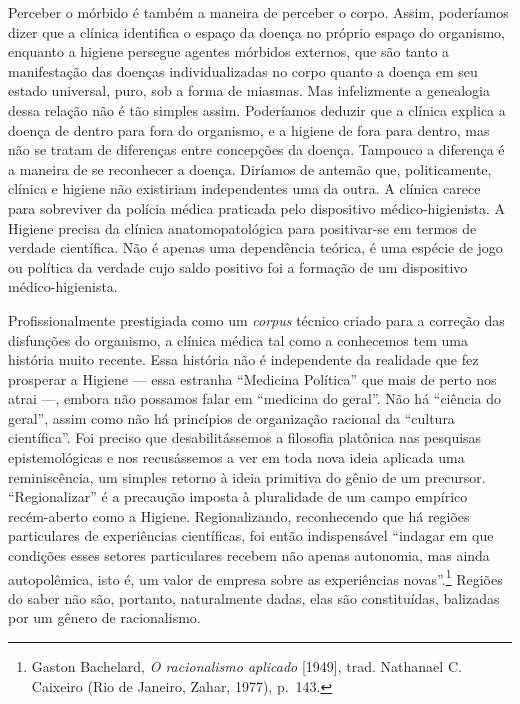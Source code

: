 Perceber o mórbido é também a maneira de perceber o corpo. Assim,
poderíamos dizer que a clínica identifica o espaço da doença no próprio
espaço do organismo, enquanto a higiene persegue agentes mórbidos
externos, que são tanto a manifestação das doenças individualizadas no
corpo quanto a doença em seu estado universal, puro, sob a forma de
miasmas. Mas infelizmente a genealogia dessa relação não é tão simples
assim. Poderíamos deduzir que a clínica explica a doença de dentro para
fora do organismo, e a higiene de fora para dentro, mas não se tratam de
diferenças entre concepções da doença. Tampouco a diferença é a maneira
de se reconhecer a doença. Diríamos de antemão que, politicamente,
clínica e higiene não existiriam independentes uma da outra. A clínica
carece para sobreviver da polícia médica praticada pelo dispositivo
médico-higienista. A Higiene precisa da clínica anatomopatológica para
positivar-se em termos de verdade científica. Não é apenas uma
dependência teórica, é uma espécie de jogo ou política da verdade cujo
saldo positivo foi a formação de um dispositivo médico-higienista.

Profissionalmente prestigiada como um \textit{corpus} técnico criado para
a correção das disfunções do organismo, a clínica médica tal como a
conhecemos tem uma história muito recente. Essa história não é
independente da realidade que fez prosperar a Higiene --- essa estranha
``Medicina Política'' que mais de perto nos atrai ---, embora não
possamos falar em ``medicina do geral''. Não há ``ciência do geral'',
assim como não há princípios de organização racional da ``cultura
científica''. Foi preciso que desabilitássemos a filosofia platônica nas
pesquisas epistemológicas e nos recusássemos a ver em toda nova ideia
aplicada uma reminiscência, um simples retorno à ideia primitiva do
gênio de um precursor. ``Regionalizar'' é a precaução imposta à
pluralidade de um campo empírico recém-aberto como a Higiene.
Regionalizando, reconhecendo que há regiões particulares de experiências
científicas, foi então indispensável ``indagar em que condições esses
setores particulares recebem não apenas autonomia, mas ainda
autopolêmica, isto é, um valor de empresa sobre as experiências
novas''.\footnote{Gaston Bachelard, \textit{O racionalismo aplicado}
  {[}1949{]}, trad. Nathanael C. Caixeiro (Rio de Janeiro, Zahar, 1977),
  p.~143.} Regiões do saber não são, portanto, naturalmente dadas, elas
são constituídas, balizadas por um gênero de racionalismo.

